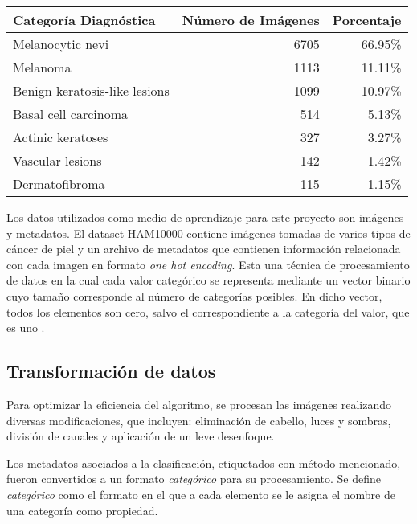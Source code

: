 \begin{tabular}{lrr}
   \hline
   \textbf{Categoría Diagnóstica} & \textbf{Número de Imágenes} & \textbf{Porcentaje} \\
   \hline
   Melanocytic nevi               & 6705                        & 66.95\%             \\
   Melanoma                       & 1113                        & 11.11\%             \\
   Benign keratosis-like lesions  & 1099                        & 10.97\%             \\
   Basal cell carcinoma           & 514                         & 5.13\%              \\
   Actinic keratoses              & 327                         & 3.27\%              \\
   Vascular lesions               & 142                         & 1.42\%              \\
   Dermatofibroma                 & 115                         & 1.15\%              \\
   \hline
   \end{tabular}


Los datos utilizados como medio de aprendizaje para este proyecto son imágenes y metadatos. El dataset HAM10000 contiene imágenes tomadas de varios tipos de cáncer de piel y un archivo de metadatos que contienen información relacionada con cada imagen en formato \textit{one hot encoding}. Esta una técnica de procesamiento de datos en la cual cada valor categórico se representa mediante un vector binario cuyo tamaño corresponde al número de categorías posibles. En dicho vector, todos los elementos son cero, salvo el correspondiente a la categoría del valor, que es uno .

\subsection{Transformación de datos}

Para optimizar la eficiencia del algoritmo, se procesan las imágenes realizando diversas modificaciones, que incluyen: eliminación de cabello, luces y sombras, división de canales y aplicación de un leve desenfoque.

Los metadatos asociados a la clasificación, etiquetados con método mencionado, fueron convertidos a un formato \textit{categórico}  para su procesamiento. Se define \textit{categórico} como el formato en el que a cada elemento se le asigna el nombre de una categoría como propiedad.

